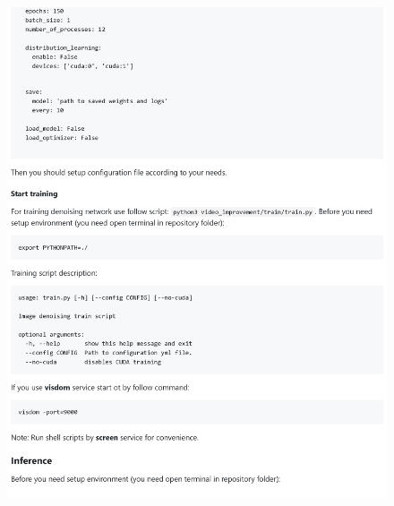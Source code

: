 \begin{figure}[h]
	\centering
	\includegraphics[width=\textwidth]{img/markdown/README_3}
	\label{fig:markdown_3}
\end{figure}

